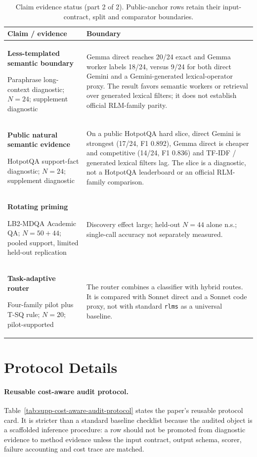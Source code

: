 \documentclass[letterpaper]{article}
\begin{document}
\begin{table}[!htbp]
\centering
\small
\setlength{\tabcolsep}{3pt}
\begin{tabular}{@{}p{2.15cm}p{4.55cm}@{}}
\toprule
\textbf{Claim / evidence} & \textbf{Boundary} \\
\midrule
\textbf{Less-templated semantic boundary}\par Paraphrase long-context diagnostic; $N=24$; supplement diagnostic & Gemma direct reaches 20/24 exact and Gemma worker labels 18/24, versus 9/24 for both direct Gemini and a Gemini-generated lexical-operator proxy. The result favors semantic workers or retrieval over generated lexical filters; it does not establish official RLM-family parity. \\
\textbf{Public natural semantic evidence}\par HotpotQA support-fact diagnostic; $N=24$; supplement diagnostic & On a public HotpotQA hard slice, direct Gemini is strongest (17/24, F1 0.892), Gemma direct is cheaper and competitive (14/24, F1 0.836) and TF-IDF / generated lexical filters lag. The slice is a diagnostic, not a HotpotQA leaderboard or an official RLM-family comparison. \\
\textbf{Rotating priming}\par LB2-MDQA Academic QA; $N=50+44$; pooled support, limited held-out replication & Discovery effect large; held-out $N=44$ alone n.s.; single-call accuracy not separately measured. \\
\textbf{Task-adaptive router}\par Four-family pilot plus T-SQ rule; $N=20$; pilot-supported & The router combines a classifier with hybrid routes. It is compared with Sonnet direct and a Sonnet code proxy, not with standard \texttt{rlms} as a universal baseline. \\
\bottomrule
\end{tabular}
\caption{Claim evidence status (part 2 of 2). Public-anchor rows retain their input-contract, split and comparator boundaries.}
\label{tab:supp-claims-2}
\end{table}

\section{Protocol Details}

\paragraph{Reusable cost-aware audit protocol.}
Table~\ref{tab:supp-cost-aware-audit-protocol} states the paper's reusable protocol card. It is stricter than a standard baseline checklist because the audited object is a scaffolded inference procedure: a row should not be promoted from diagnostic evidence to method evidence unless the input contract, output schema, scorer, failure accounting and cost trace are matched.
\end{document}

